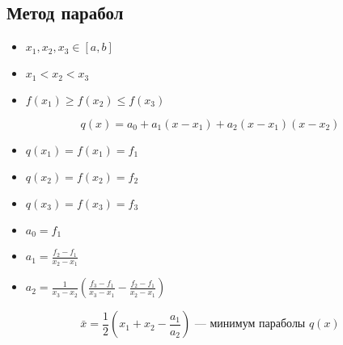 \documentclass[english]{article}
\theoremstyle{plain}
\theoremstyle{remark}
\theoremstyle{definition}
\begin{document}
\subsection{Метод парабол}
\label{sec:org103680e}
\begin{itemize}
\item \(x_1, x_2, x_3 \in [a, b]\)
\item \(x_1 < x_2 < x_3\)
\item \(f(x_1) \ge f(x_2) \le f(x_3)\)
\end{itemize}
\[ q(x) = a_0 + a_1(x - x_1) + a_2(x - x_1)(x - x_2) \]
\begin{itemize}
\item \(q(x_1) = f(x_1) = f_1\)
\item \(q(x_2) = f(x_2) = f_2\)
\item \(q(x_3) = f(x_3) = f_3\)
\end{itemize}


\begin{itemize}
\item \(a_0 = f_1\)
\item \(a_1 = \frac{f_2 - f_1}{x_2 - x_1}\)
\item \(a_2 = \frac{1}{x_3 - x_2}\left(\frac{f_3 - f_1}{x_3 - x_1} - \frac{f_2 - f_1}{x_2 - x_1}\right)\)
\end{itemize}
\[ \bar{x} = \frac{1}{2}\left(x_1 + x_2 - \frac{a_1}{a_2}\right)\text{ --- минимум параболы } q(x) \]
\end{document}
